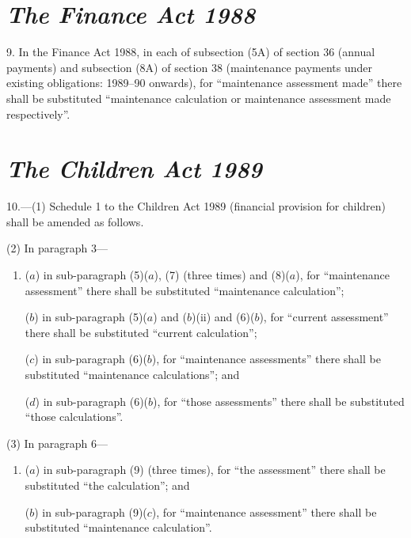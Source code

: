 \documentclass[12pt,a4paper]{article}
\begin{document}

\section*{\itshape The Finance Act 1988}

9. In the Finance Act 1988, in each of subsection (5A)  of section 36 (annual payments) and subsection (8A) of section 38 (maintenance payments under existing obligations: 1989--90 onwards), for “maintenance assessment made” there shall be substituted “maintenance calculation or maintenance assessment made respectively”.


\section*{\itshape The Children Act 1989}

10.---(1) Schedule 1 to the Children Act 1989 (financial provision for children) shall be amended as follows.

(2) In paragraph 3—
\begin{enumerate}\item[]
($a$) in sub-paragraph (5)($a$), (7)  (three times) and (8)($a$), for “maintenance assessment” there shall be substituted “maintenance calculation”;

($b$) in sub-paragraph (5)($a$)  and ($b$)(ii)  and (6)($b$), for “current assessment” there shall be substituted “current calculation”;

($c$) in sub-paragraph (6)($b$), for “maintenance assessments” there shall be substituted “maintenance calculations”; and

($d$) in sub-paragraph (6)($b$), for “those assessments” there shall be substituted “those calculations”.
\end{enumerate}

(3) In paragraph 6—
\begin{enumerate}\item[]
($a$) in sub-paragraph (9)  (three times), for “the assessment” there shall be substituted “the calculation”; and

($b$) in sub-paragraph (9)($c$), for “maintenance assessment” there shall be substituted “maintenance calculation”.
\end{enumerate}
\end{document}
